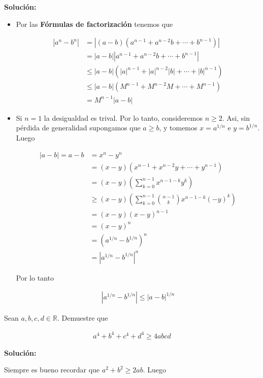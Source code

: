 \documentclass[12pt]{book}
\begin{document}
\textbf{Solución:}


\begin{itemize}
    \item[\textbf{a)}]
Por las \textbf{Fórmulas de factorización} tenemos que 

\begin{align*}
    |a^n-b^n|&=|(a-b)(a^{n-1}+a^{n-2}b+\cdots + b^{n-1})| \\
    &=|a-b||a^{n-1}+a^{n-2}b+\cdots + b^{n-1}| \\
    &\leq |a-b|(|a|^{n-1}+|a|^{n-2}|b|+\cdots + |b|^{n-1}) \\
    &\leq|a-b|(M^{n-1}+M^{n-2}M+ \cdots + M^{n-1}) \\
    &=M^{n-1}|a-b|
\end{align*}

\item[\textbf{b)}] Si $n=1$ la desigualdad es trival. Por lo tanto, consideremos $n\geq 2$. Asi, sin pérdida de generalidad supongamos que $a\geq b$, y tomemos $x=a^{1/n}$ e $y=b^{1/n}$. Luego

\begin{align*}
    |a-b|=a-b&=x^n-y^n \\
    &=(x-y)(x^{n-1}+x^{n-2}y+ \cdots + y^{n-1}) \\
    &=(x-y)\left( \sum_{k=0}^{n-1} x^{n-1-k}y^k\right) \\
    &\geq(x-y)\left( \sum_{k=0}^{n-1} \binom{n-1}{k}x^{n-1-k}(-y)^k\right) \\
    &=(x-y)(x-y)^{n-1} \\
    &=(x-y)^n \\
    &=(a^{1/n}-b^{1/n})^n \\
    &=|a^{1/n}-b^{1/n}|^n
\end{align*}

Por lo tanto 

\begin{align}
    |a^{1/n}-b^{1/n}| \leq |a-b|^{1/n}
\end{align}
\end{itemize}

\begin{prob}{}{}
    Sean $a,b,c,d \in \mathbb{R}$. Demuestre que 

    \begin{align*}
        a^4+b^4+c^4+d^4 \geq 4abcd
    \end{align*}
\end{prob}

\textbf{Solución:}

Siempre es bueno recordar que $a^2+b^2 \geq 2ab$. Luego
\end{document}
